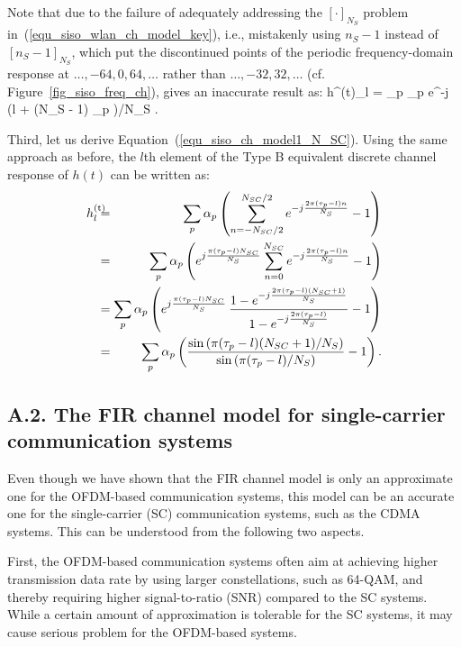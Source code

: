 \documentclass[11pt,draftnofoot,onecolumn]{IEEEtran}
\begin{document}
Note that due to the failure of adequately addressing the
$[\cdot]_{N_S}$ problem in~(\ref{equ_siso_wlan_ch_model_key}), i.e.,
mistakenly using $n_S - 1$ instead of $[n_S - 1]_{N_S}$, which put
the discontinued points of the periodic frequency-domain response at
$\dots,-64, 0, 64, \dots$ rather than $\dots, -32, 32, \dots$ (cf.
Figure~\ref{fig_siso_freq_ch}), \cite{BeekEdforsSandell1995}
gives an inaccurate result as: %
\ben %
h^{(\rm t)}_{l} = \sum_p
\alpha_p e^{-j \pi (l + (N_S - 1) \tau_p )/{N_S}}
   .
\label{equ_siso_ch_model1_wrong} %
\een

Third, let us derive Equation~(\ref{equ_siso_ch_model1_N_SC}). Using
the same approach as before, the $l$th element of the Type B
equivalent discrete channel response of $h(t)$ can be written as:
\begin{eqnarray}
h^{(\rm t)}_{l} & \bs = \bs &
   \sum_p \alpha_p \left ( \sum_{n = -N_{SC}/2}^{N_{SC}/2}
   e^{-j \frac{2\pi (\tau_p-l) n}{N_S}} -1 \right ) \nonumber \\
        & \bs = \bs &
   \sum_p \alpha_p \left ( e^{j \frac{\pi (\tau_p-l) N_{SC}}{N_S}}
      \sum_{n = 0}^{N_{SC}}
      e^{-j \frac{2\pi (\tau_p-l) n}{N_S}} -1 \right ) \nonumber \\
        & \bs = \bs &
   \sum_p \alpha_p \left ( e^{j \frac{\pi (\tau_p-l) N_{SC}}{N_S}} \,
      \frac{1 - e^{-j \frac{2\pi (\tau_p-l) (N_{SC}+1) }{N_S} } }
      {1- e^{-j \frac{2\pi (\tau_p-l) }{N_S}} } -1 \right ) \nonumber \\
        & \bs = \bs &
   \sum_p \alpha_p \left (
      \frac{\sin \left ( \pi (\tau_p-l) (N_{SC}+1) / N_S \right ) }
      {\sin \left ( \pi (\tau_p-l) / {N_S} \right ) } -1 \right ).
\end{eqnarray}



\subsection*{A.2. The FIR channel model for single-carrier
communication systems} %
\label{app_fir_for_cdma} %

Even though we have shown that the FIR channel model is only an
approximate one for the OFDM-based communication systems, this model
can be an accurate one for the single-carrier (SC) communication
systems, such as the CDMA systems. This can be understood from the
following two aspects.

First, the OFDM-based communication systems often aim at achieving
higher transmission data rate by using larger constellations, such
as 64-QAM, and thereby requiring higher signal-to-ratio (SNR)
compared to the SC systems. While a certain amount of approximation
is tolerable for the SC systems, it may cause serious problem for
the OFDM-based systems.
\end{document}
